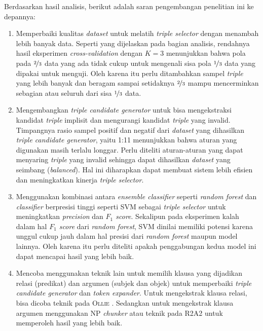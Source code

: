 Berdasarkan hasil analisis, berikut adalah saran pengembangan penelitian ini ke depannya:

\begin{enumerate}
	\item Memperbaiki kualitas \textit{dataset} untuk melatih \textit{triple selector} dengan menambah lebih banyak data. Seperti yang dijelaskan pada bagian analisis, rendahnya hasil eksperimen \textit{cross-validation} dengan $K = 3$ menunjukkan bahwa pola pada $\nicefrac{2}{3}$ data yang ada tidak cukup untuk mengenali sisa pola $\nicefrac{1}{3}$ data yang dipakai untuk menguji. Oleh karena itu perlu ditambahkan sampel \textit{triple} yang lebih banyak dan beragam sampai setidaknya $\nicefrac{2}{3}$ mampu mencerminkan sebagian atau seluruh dari sisa $\nicefrac{1}{3}$ data.
	
	\item Mengembangkan \textit{triple candidate generator} untuk bisa mengekstraksi kandidat \textit{triple} implisit dan mengurangi kandidat \textit{triple} yang invalid. Timpangnya rasio sampel positif dan negatif dari \textit{dataset} yang dihasilkan \textit{triple candidate generator}, yaitu 1:11 menunjukkan bahwa aturan yang digunakan masih terlalu longgar. Perlu diteliti aturan-aturan yang dapat menyaring \textit{triple} yang invalid sehingga dapat dihasilkan \textit{dataset} yang seimbang (\textit{balanced}). Hal ini diharapkan dapat membuat sistem lebih efisien dan meningkatkan kinerja \textit{triple selector}.
	
	\item Menggunakan kombinasi antara \textit{ensemble classifier} seperti \textit{random forest} dan \textit{classifier} berpresisi tinggi seperti SVM sebagai \textit{triple selector} untuk meningkatkan \textit{precision} dan \textit{$F_1$ score}. Sekalipun pada eksperimen kalah dalam hal \textit{$F_1$ score} dari \textit{random forest}, SVM dinilai memiliki potensi karena unggul cukup jauh dalam hal presisi dari \textit{random forest} maupun model lainnya. Oleh karena itu perlu diteliti apakah penggabungan kedua model ini dapat mencapai hasil yang lebih baik.
	
	\item Mencoba menggunakan teknik lain untuk memilih klausa yang dijadikan relasi (predikat) dan argumen (subjek dan objek) untuk memperbaiki \textit{triple candidate generator} dan \textit{token expander}. Untuk mengekstrak klausa relasi, bisa dicoba teknik pada \textsc{Ollie} \citep{schmitz2012open}. Sedangkan untuk mengekstrak klausa argumen menggunakan NP \textit{chunker} atau teknik pada \textsc{R2A2} \citep{etzioni2011open} untuk memperoleh hasil yang lebih baik.
	

\end{enumerate}

